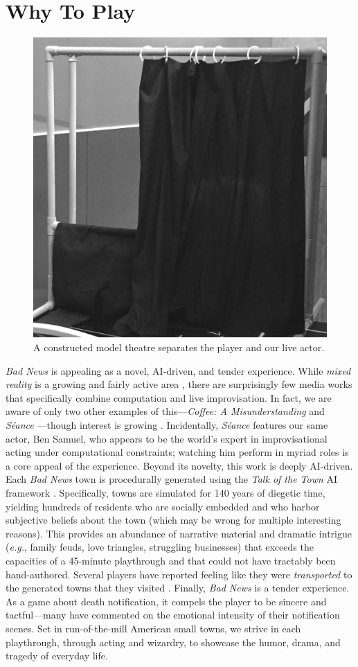 \documentclass[letterpaper]{article}
\begin{document}
\section{Why To Play}


\begin{figure}[t]
  \centering
  \includegraphics[width=0.64\columnwidth]{the_puppet_theatre.png}
  \caption{A constructed model theatre separates the player and our live actor.}
  \label{fig:model_theatre}
\end{figure}

\textit{Bad News} is appealing as a novel, AI-driven, and tender experience. While \textit{mixed reality} is a growing and fairly active area \cite{ohta2014mixed}, there are surprisingly few media works that specifically combine computation and live improvisation. In fact, we are aware of only two other examples of this---\textit{Coffee: A Misunderstanding} \cite{squinkifer2014coffee} and \textit{S\'{e}ance} \cite{seance}---though interest is growing \cite{martens2016towards}. Incidentally, \textit{S\'{e}ance} features our same actor, Ben Samuel, who appears to be the world's expert in improvisational acting under computational constraints; watching him perform in myriad roles is a core appeal of the experience. Beyond its novelty, this work is deeply AI-driven. Each \textit{Bad News} town is procedurally generated using the \textit{Talk of the Town} AI framework \cite{ryan2015toward}. Specifically, towns are simulated for 140 years of diegetic time, yielding hundreds of residents who are socially embedded and who harbor subjective beliefs about the town (which may be wrong for multiple interesting reasons). This provides an abundance of narrative material and dramatic intrigue (\textit{e.g.}, family feuds, love triangles, struggling businesses) that exceeds the capacities of a 45-minute playthrough and that could not have tractably been hand-authored. Several players have reported feeling like they were \textit{transported} to the generated towns that they visited \cite{green2004understanding}. Finally, \textit{Bad News} is a tender experience. As a game about death notification, it compels the player to be sincere and tactful---many have commented on the emotional intensity of their notification scenes. Set in run-of-the-mill American small towns, we strive in each playthrough, through acting and wizardry, to showcase the humor, drama, and tragedy of everyday life.
\end{document}
